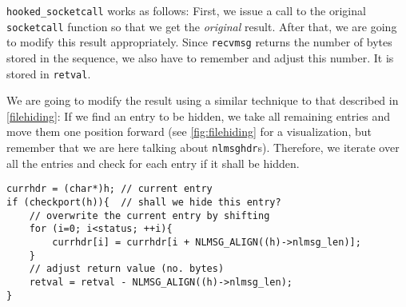 \documentclass[10pt, letterpaper]{article}
\begin{document}
\texttt{hooked\_socketcall} works as follows: First, we issue a call to the original \texttt{socketcall} function so that we get the \emph{original} result. After that, we are going to modify this result appropriately. Since \texttt{recvmsg} returns the number of bytes stored in the sequence, we also have to remember and adjust this number. It is stored in \texttt{retval}.

We are going to modify the result using a similar technique to that described in \autoref{filehiding}: If we find an entry to be hidden, we take all remaining entries and move them one position forward (see \autoref{fig:filehiding} for a visualization, but remember that we are here talking about \texttt{nlmsghdr}s). Therefore, we iterate over all the entries and check for each entry if it shall be hidden.

\begin{verbatim}
currhdr = (char*)h; // current entry
if (checkport(h)){  // shall we hide this entry?
    // overwrite the current entry by shifting
    for (i=0; i<status; ++i){
        currhdr[i] = currhdr[i + NLMSG_ALIGN((h)->nlmsg_len)];
    }
    // adjust return value (no. bytes)
    retval = retval - NLMSG_ALIGN((h)->nlmsg_len);
}
\end{verbatim}
\end{document}
